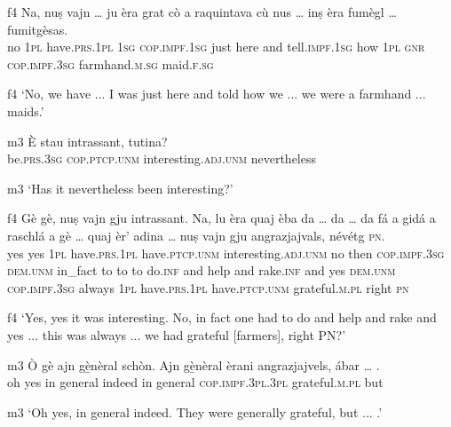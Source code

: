 \begin{linenumbers}
	\gll {\ob}f4{\cb} Na, nuṣ vajn … ju èra grat cò a raquintava cù nus … inṣ èra fumègl … fumitgèsas.\\
	{} no \textsc{1pl} have.\textsc{prs.1pl} {} \textsc{1sg} \textsc{cop.impf.1sg} just here and tell.\textsc{impf.1sg} how \textsc{1pl} {} \textsc{gnr} \textsc{cop.impf.3sg} farmhand.\textsc{m.sg} {} maid.\textsc{f.sg}\\
\end{linenumbers}
\medskip
\glt {\ob}f4{\cb} `No, we have ... I was just here and told how we ... we were a farmhand ... maids.'
\medskip

\begin{linenumbers}
	\gll {\ob}m3{\cb} È stau intrassant, tutina?\\
	    {} be.\textsc{prs.3sg} \textsc{cop.ptcp.unm} interesting.\textsc{adj.unm} nevertheless \\
\end{linenumbers}
\medskip
\glt {\ob}m3{\cb} `Has it nevertheless been interesting?'
\medskip

\begin{linenumbers}
	\gll  {\ob}f4{\cb} Gè gè, nuṣ vajn gju intrassant. Na, lu èra quaj èba da … da … da fá a gidá a raschlá a gè … quaj èr’ adina … nuṣ vajn gju angrazjajvals, névétg \textsc{pn}.\\
{}	yes yes \textsc{1pl} have.\textsc{prs.1pl} have.\textsc{ptcp.unm} interesting.\textsc{adj.unm} no then \textsc{cop.impf.3sg} \textsc{dem.unm} in\_fact to {} to {} to do.\textsc{inf} and help and rake.\textsc{inf} and yes {} \textsc{dem.unm} \textsc{cop.impf.3sg} always {} \textsc{1pl} have.\textsc{prs.1pl} have.\textsc{ptcp.unm} grateful.\textsc{m.pl} right \textsc{pn} \\
\end{linenumbers}
\medskip
\glt {\ob}f4{\cb} `Yes, yes it was interesting. No, in fact one had to do and help and rake and yes ... this was always ... we had grateful [farmers], right PN?'
\medskip

\begin{linenumbers}
	\gll {\ob}m3{\cb} Ò gè ajn gè̱nèral schòn. Ajn gè̱nèral èrani angrazjajvels, ábar … .   \\
{}	oh yes in general indeed in general \textsc{cop.impf.3pl.3pl} grateful.\textsc{m.pl}  but\\
\end{linenumbers}
\medskip
\glt {\ob}m3{\cb} `Oh yes, in general indeed. They were generally grateful, but ... .'
\medskip

